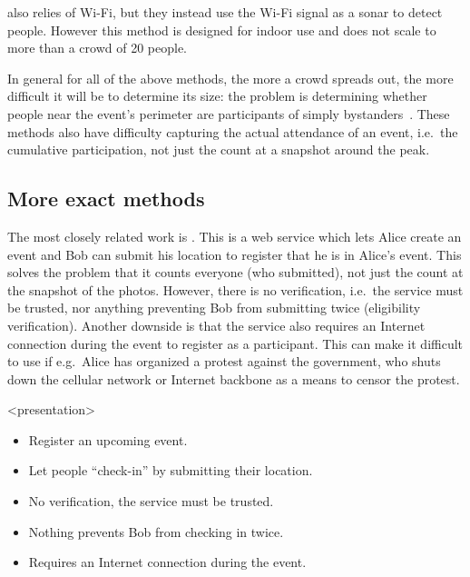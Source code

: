 \Textcite{WifiCrowdCounting} also relies of Wi-Fi, but they instead use the 
Wi-Fi signal as a sonar to detect people.
However this method is designed for indoor use and does not scale to more than 
a crowd of 20 people.

In general for all of the above methods, the more a crowd spreads out, the more
difficult it will be to determine its size:
the problem is determining whether people near the event's perimeter are 
participants of simply bystanders~\cite{HowToEstimateCrowdSize}.
These methods also have difficulty capturing the actual attendance of an event,
i.e.\ the cumulative participation, not just the count at a snapshot around the 
peak.

\subsection<presentation>{More exact methods}

The most closely related work is \textcite{CrowdCount}.
This is a web service which lets Alice create an event and Bob can submit his 
location to register that he is in Alice's event.
This solves the problem that it counts everyone (who submitted), not just the 
count at the snapshot of the photos.
However, there is no verification, i.e.\ the service must be trusted, nor 
anything preventing Bob from submitting twice (eligibility verification).
Another downside is that the service also requires an Internet connection 
during the event to register as a participant.
This can make it difficult to use if e.g.\ Alice has organized a protest 
against the government, who shuts down the cellular network or Internet 
backbone as a means to censor the protest.

\begin{frame}<presentation>
  \begin{solution}
    \begin{itemize}
      \item Register an upcoming event.
      \item Let people \enquote{check-in} by submitting their location.
    \end{itemize}
  \end{solution}

  \pause

  \begin{remark}
    \begin{itemize}
      \item No verification, the service must be trusted.
      \item Nothing prevents Bob from checking in twice.
      \item Requires an Internet connection during the event.
    \end{itemize}
  \end{remark}
\end{frame}
